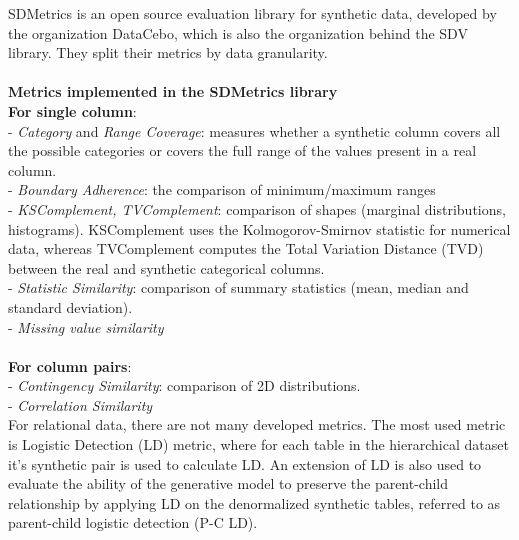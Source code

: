 \documentclass[fleqn,moreauthors,10pt]{ds_report}
\begin{document}
SDMetrics is an open source evaluation library for synthetic data, developed by the organization DataCebo, which is also the organization behind the SDV library. They split their metrics by data granularity. \\\\
\textbf{Metrics implemented in the SDMetrics library}\\
\textbf{For single column}:\\
- \textit{Category} and \textit{Range Coverage}: measures whether a synthetic column covers all the possible categories or covers the full range of the values present in a real column.\\
- \textit{Boundary Adherence}: the comparison of minimum/maximum ranges\\
- \textit{KSComplement, TVComplement}: comparison of shapes (marginal distributions, histograms). KSComplement uses the Kolmogorov-Smirnov statistic for numerical data, whereas TVComplement computes the Total Variation Distance (TVD) between the real and synthetic categorical columns.\\
- \textit{Statistic Similarity}: comparison of summary statistics (mean, median and standard deviation).\\
- \textit{Missing value similarity}\\ \\
\textbf{For column pairs}:\\
- \textit{Contingency Similarity}: comparison of 2D distributions.\\
- \textit{Correlation Similarity}\\
For relational data, there are not many developed metrics. The most used metric is Logistic Detection (LD) metric, where for each table in the hierarchical dataset it's synthetic pair is used to calculate LD. An extension of LD is also used to evaluate the ability of the generative model to preserve the parent-child relationship by applying LD on the denormalized synthetic tables, referred to as parent-child logistic detection (P-C LD). 
\end{document}
